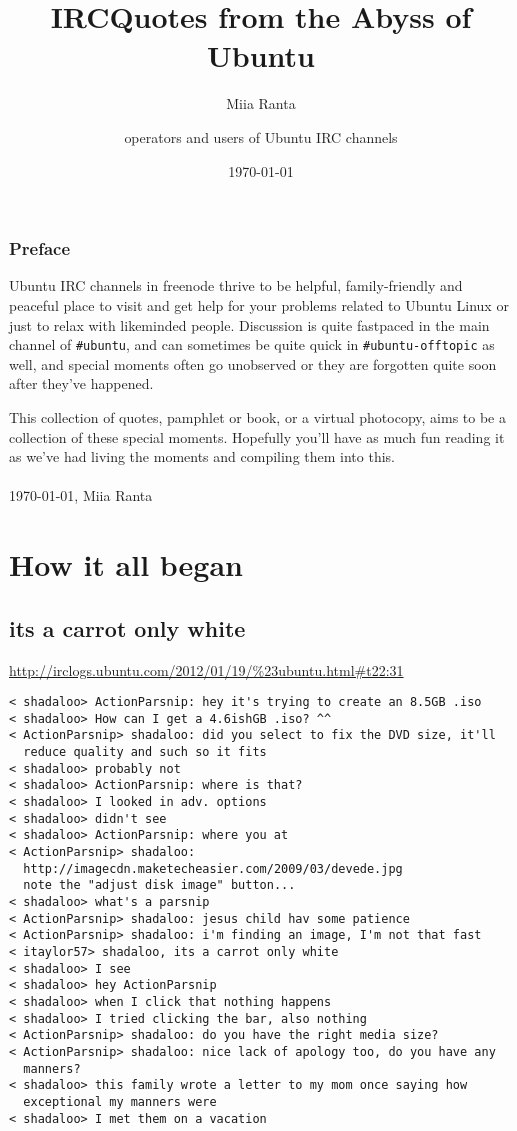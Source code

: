 \documentclass[a4paper]{book}
\title{IRCQuotes from the Abyss of Ubuntu}
\author{Miia Ranta \and operators and users of Ubuntu IRC channels}
\date{\today}
\begin{document}
\maketitle{}
\thispagestyle{empty}
\cleardoublepage{}

\pagestyle{headings}
\setcounter{page}{1}

\subsection*{Preface}

Ubuntu IRC channels in freenode thrive to be helpful, family-friendly 
and peaceful place to visit and get help for your problems related to 
Ubuntu Linux or just to relax with likeminded people. Discussion is quite 
fastpaced in the main channel of \verb$#ubuntu$, and can sometimes be quite 
quick in \verb$#ubuntu-offtopic$ as well, and special moments often go 
unobserved or they are forgotten quite soon after they've happened.

This collection of quotes, pamphlet or book, or a virtual photocopy, 
aims to be a collection of these special moments. Hopefully you'll 
have as much fun reading it as we've had living the moments and 
compiling them into this.
\\
\\
\today, Miia Ranta 
\tableofcontents
\cleardoublepage

\setcounter{page}{1}
\chapter{How it all began}

\section*{its a carrot only white}
\url{http://irclogs.ubuntu.com/2012/01/19/%23ubuntu.html#t22:31}

\begin{verbatim}
< shadaloo> ActionParsnip: hey it's trying to create an 8.5GB .iso
< shadaloo> How can I get a 4.6ishGB .iso? ^^
< ActionParsnip> shadaloo: did you select to fix the DVD size, it'll 
  reduce quality and such so it fits
< shadaloo> probably not
< shadaloo> ActionParsnip: where is that?
< shadaloo> I looked in adv. options
< shadaloo> didn't see
< shadaloo> ActionParsnip: where you at
< ActionParsnip> shadaloo: 
  http://imagecdn.maketecheasier.com/2009/03/devede.jpg
  note the "adjust disk image" button...
< shadaloo> what's a parsnip
< ActionParsnip> shadaloo: jesus child hav some patience
< ActionParsnip> shadaloo: i'm finding an image, I'm not that fast
< itaylor57> shadaloo, its a carrot only white
< shadaloo> I see
< shadaloo> hey ActionParsnip
< shadaloo> when I click that nothing happens
< shadaloo> I tried clicking the bar, also nothing
< ActionParsnip> shadaloo: do you have the right media size?
< ActionParsnip> shadaloo: nice lack of apology too, do you have any 
  manners?
< shadaloo> this family wrote a letter to my mom once saying how 
  exceptional my manners were
< shadaloo> I met them on a vacation
\end{verbatim}
\end{document}
